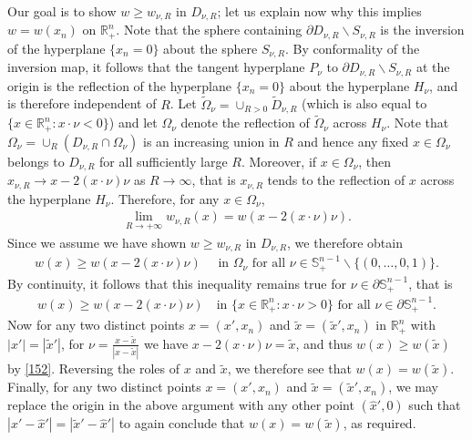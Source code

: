 \documentclass[12pt]{article}
\numberwithin{equation}{section}
\theoremstyle{plain}
\theoremstyle{definition}
\begin{document}
Our goal is to show $w \geq w_{\nu,R}$ in $D_{\nu,R}$; let us explain now why this implies $w=w(x_n)$ on $\mathbb{R}_+^n$. Note that the sphere containing $\partial D_{\nu,R}\backslash S_{\nu,R}$ is the inversion of the hyperplane $\{x_n=0\}$ about the sphere $S_{\nu,R}$. By conformality of the inversion map, it follows that the tangent hyperplane $P_\nu$ to $\partial D_{\nu,R}\backslash S_{\nu,R}$ at the origin is the reflection of the hyperplane $\{x_n=0\}$ about the hyperplane $H_\nu$, and is therefore independent of $R$. Let $\widetilde{\Omega}_\nu = \cup_{R>0}\widetilde{D}_{\nu, R}$ (which is also equal to $ \{x\in\mathbb{R}^n_+:x\cdot\nu<0\}$) and let $\Omega_\nu$ denote the reflection of $\widetilde{\Omega}_\nu$ across $H_\nu$. Note that $\Omega_\nu = \cup_R (D_{\nu,R}\cap \Omega_\nu)$ is an increasing union in $R$ and hence any fixed $x\in \Omega_\nu$ belongs to $D_{\nu,R}$ for all sufficiently large $R$. Moreover, if $x\in \Omega_\nu$, then $x_{\nu,R}\rightarrow x - 2(x\cdot \nu)\nu$ as $R\rightarrow\infty$, that is $x_{\nu,R}$ tends to the reflection of $x$ across the hyperplane $H_\nu$. Therefore, for any $x\in \Omega_\nu$, 
\begin{align*}
\lim_{R\rightarrow+\infty}w_{\nu,R}(x)= w(x-2(x\cdot \nu)\nu).
\end{align*}
Since we assume we have shown $w \geq w_{\nu,R}$ in $D_{\nu,R}$, we therefore obtain 
\begin{align*}
w(x) \geq  w(x-2(x\cdot \nu)\nu) \quad \text{ in }\Omega_\nu \text{ for all } \nu\in\mathbb{S}^{n-1}_+\backslash\{(0,\dots,0,1)\}. 
\end{align*}
By continuity, it follows that this inequality remains true for $\nu\in\partial\mathbb{S}_+^{n-1}$, that is
\begin{align}\label{152}
w(x) \geq w(x-2(x\cdot \nu)\nu) \quad\text{in }\{x\in\mathbb{R}_+^n: x\cdot \nu>0\}  \text{ for all } \nu\in\partial \mathbb{S}^{n-1}_+. 
\end{align}
Now for any two distinct points $x=(x', x_n)$ and $\widetilde{x}=(\widetilde{x}', x_n)$ in $\mathbb{R}_+^n$ with $|x'| = |\widetilde{x}'|$, for $\nu = \frac{x-\widetilde{x}}{|x-\widetilde{x}|}$ we have $x - 2(x\cdot\nu)\nu = \widetilde{x}$, and thus $w(x) \geq w(\widetilde{x})$ by \eqref{152}. Reversing the roles of $x$ and $\widetilde{x}$, we therefore see that $w(x) = w(\widetilde{x})$. Finally, for any two distinct points $x=(x', x_n)$ and $\widetilde{x}=(\widetilde{x}', x_n)$, we may replace the origin in the above argument with any other point $(\hat{x}',0)$ such that $|x'-\hat{x}'| = |\widetilde{x}' - \hat{x}'|$ to again conclude that $w(x) = w(\widetilde{x})$, as required.\medskip 
\end{document}
